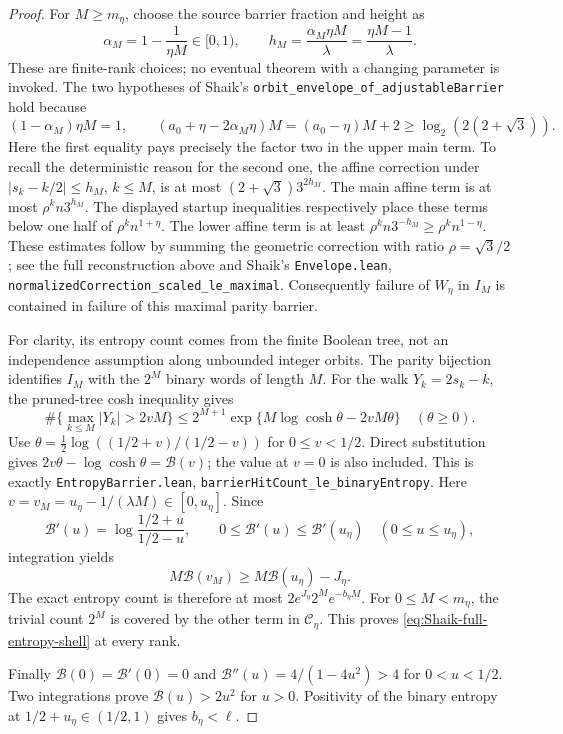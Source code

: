 \begin{proof}
For \(M\ge m_\eta\), choose the source barrier fraction and height as
\[
 \alpha_M=1-\frac1{\eta M}\in[0,1),\qquad
 h_M=\frac{\alpha_M\eta M}{\lambda}
     =\frac{\eta M-1}{\lambda}.
\]
These are finite-rank choices; no eventual theorem with a changing
parameter is invoked. The two hypotheses of Shaik's
\texttt{orbit\_envelope\_of\_adjustableBarrier} hold because
\[
 (1-\alpha_M)\eta M=1,\qquad
 (a_0+\eta-2\alpha_M\eta)M=(a_0-\eta)M+2
 \ge\log_2(2(2+\sqrt3)).
\]
Here the first equality pays precisely the factor two in the upper
main term. To recall the deterministic reason for the second one,
the affine correction under
\(|s_k-k/2|\le h_M\), \(k\le M\), is at most
\((2+\sqrt3)3^{2h_M}\).
The main affine term is at most
\(\rho^k n3^{h_M}\).
The displayed startup inequalities respectively place these terms below
one half of \(\rho^k n^{1+\eta}\).
The lower affine term is at least
\(\rho^k n3^{-h_M}\ge\rho^k n^{1-\eta}\).
These estimates follow by summing the geometric correction with ratio
\(\rho=\sqrt3/2\); see the full reconstruction above and
Shaik's \texttt{Envelope.lean},
\texttt{normalizedCorrection\_scaled\_le\_maximal}.
Consequently failure of \(W_\eta\) in \(I_M\) is contained in failure
of this maximal parity barrier.

For clarity, its entropy count comes from the finite Boolean tree, not
an independence assumption along unbounded integer orbits. The parity
bijection identifies \(I_M\) with the \(2^M\) binary words of length \(M\).
For the walk \(Y_k=2s_k-k\), the pruned-tree cosh inequality gives
\[
 \#\{\max_{k\le M}|Y_k|>2vM\}
 \le 2^{M+1}\exp\{M\log\cosh\theta-2vM\theta\}
 \quad(\theta\ge0).
\]
Use
\(\theta=\frac12\log((1/2+v)/(1/2-v))\) for \(0\le v<1/2\).
Direct substitution gives
\(2v\theta-\log\cosh\theta=\mathcal B(v)\);
the value at \(v=0\) is also included. This is exactly
\texttt{EntropyBarrier.lean}, \texttt{barrierHitCount\_le\_binaryEntropy}.
Here \(v=v_M=u_\eta-1/(\lambda M)\in[0,u_\eta]\).
Since
\[
 \mathcal B'(u)=\log\frac{1/2+u}{1/2-u},
 \qquad
 0\le\mathcal B'(u)\le\mathcal B'(u_\eta)
 \quad(0\le u\le u_\eta),
\]
integration yields
\[
 M\mathcal B(v_M)\ge M\mathcal B(u_\eta)-J_\eta.
\]
The exact entropy count is therefore at most
\(2e^{J_\eta}2^Me^{-b_\eta M}\).
For \(0\le M<m_\eta\), the trivial count \(2^M\) is covered by
the other term in \(\mathcal C_\eta\).
This proves \eqref{eq:Shaik-full-entropy-shell} at every rank.

Finally \(\mathcal B(0)=\mathcal B'(0)=0\) and
\(\mathcal B''(u)=4/(1-4u^2)>4\) for \(0<u<1/2\).
Two integrations prove \(\mathcal B(u)>2u^2\) for \(u>0\).
Positivity of the binary entropy at \(1/2+u_\eta\in(1/2,1)\)
gives \(b_\eta<\ell\).
\end{proof}

